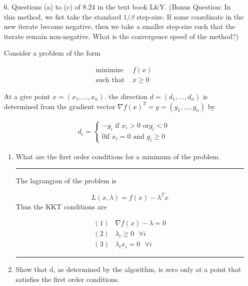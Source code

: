 \documentclass[12pt,letterpaper]{article}
\begin{document}
\begin{enumerate}
\item[6.] Questions (a) to (c) of 8.24 in the text book L\&Y. (Bonus Question: In this method, we fist take the standard $1/\beta$ step-size. If some coordinate in the new iterate become negative, then we take a smaller step-size such that the iterate remain non-negative.  What is the convergence speed of the method?)




Consider a problem of the form 

\begin{equation*}
\begin{aligned}
\mbox{minimize } & f(x) \\ 
\mbox{such that } & x \geq 0
\end{aligned}
\end{equation*}

At a give point $x = (x_1, \hdots, x_n).$ the direction $d = (d_1, \hdots, d_n)$ is determined from the gradient vector $\nabla f(x)^T = g = (g_1, \hdots, g_n)$ by 

\begin{gather*}
d_i = \begin{cases} -g_i \mbox{ if } x_i > 0 \mbox{ or} g_i < 0 \\ 
0 \mbox {if } x_i = 0 \mbox{ and } g_i \geq 0 \end{cases}
\end{gather*}

\begin{enumerate}

\item  What are the first order conditions for a minimum of the problem. 


\rule{\textwidth}{1pt}


The lagrangian of the problem is 

\[
L(x, \lambda) = f(x) - \lambda^T x 
\]
Thus the KKT conditions are

\begin{equation*}
\begin{aligned}
(1) & \nabla f(x) -  \lambda = 0 \\ 
(2) & \lambda_i  \geq 0 \mbox{    } \forall i \\ 
(3) & \lambda_i x_i = 0 \mbox{   } \forall i 
\end{aligned}
\end{equation*}

\rule{\textwidth}{1pt}


\item Show that d, as determined by the algorithm, is zero only at a point that satisfies the first order conditions. 


\end{enumerate}
\end{enumerate}
\end{document}
